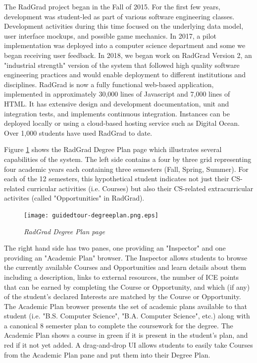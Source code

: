 \documentclass[acmsmall]{acmart}
\begin{document}
The RadGrad project began in the Fall of 2015. For the first few years, development was student-led as part of various software engineering classes. Development activities during this time focused on the underlying data model, user interface mockups, and possible game mechanics. In 2017, a pilot implementation was deployed into a computer science department and some we began receiving user feedback. In 2018, we began work on RadGrad Version 2, an "industrial strength" version of the system that followed high quality software engineering practices and would enable deployment to different institutions and disciplines. RadGrad is now a fully functional web-based application, implemented in approximately 30,000 lines of Javascript and 7,000 lines of HTML. It has extensive design and development documentation, unit and integration tests, and implements continuous integration. Instances can be deployed locally or using a cloud-based hosting service such as Digital Ocean. Over 1,000 students have used RadGrad to date.

Figure \ref{fig:radgrad} shows the RadGrad Degree Plan page which illustrates several capabilities of the system. The left side contains a four by three grid representing four academic years each containing three semesters (Fall, Spring, Summer).  For each of the 12 semesters, this hypothetical student indicates not just their CS-related curricular activities (i.e. Courses) but also their CS-related extracurricular activites (called "Opportunities" in RadGrad).

\begin{figure}[ht]
\centering
\texttt{[image: guidedtour-degreeplan.png.eps]}
\caption{\em RadGrad Degree Plan page}
\label{fig:radgrad}
\end{figure}

The right hand side has two panes, one providing an "Inspector" and one providing an "Academic Plan" browser. The Inspector allows students to browse the currently available Courses and Opportunities and learn details about them including a description, links to external resources, the number of ICE points that can be earned by completing the Course or Opportunity, and which (if any) of the student's declared Interests are matched by the Course or Opportunity. The Academic Plan browser presents the set of academic plans available to that student (i.e. "B.S. Computer Science", "B.A. Computer Science", etc.) along with a canonical 8 semester plan to complete the coursework for the degree. The Academic Plan shows a course in green if it is present in the student's plan, and red if it not yet added. A drag-and-drop UI allows students to easily take Courses from the Academic Plan pane and put them into their Degree Plan.
\end{document}
